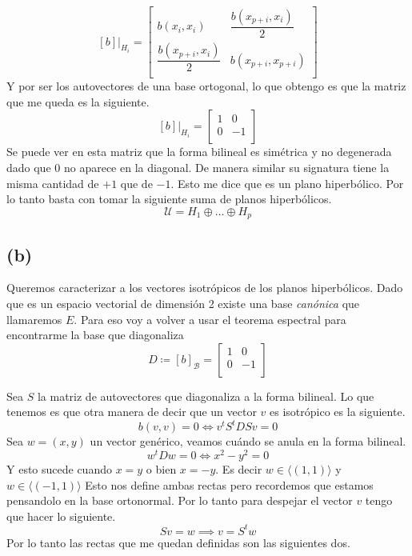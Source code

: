 \documentclass{article}
\begin{document}
 \begin{equation*}
 	\left. [b]\right| _ {H_i}	=
 	\begin{bmatrix}
 	b(x_{i}, x_{i}) & \dfrac{b(x_{p+i}, x_{i})}{2}  \\
 	\dfrac{b(x_{p+i}, x_{i})}{2} & b(x_{p+i}, x_{p+i}) \\
 	\end{bmatrix}
\end{equation*} 
  Y por ser los autovectores de una base ortogonal, lo que obtengo es que la matriz que me queda es la siguiente.
  \begin{equation*}
  \left. [b]\right| _ {H_i}	=
  \begin{bmatrix}
  1 & 0  \\
  0 & -1 \\
  \end{bmatrix}
  \end{equation*}
Se puede ver en esta matriz que la forma bilineal es simétrica y no degenerada dado que 0 no aparece en la diagonal. De manera similar su signatura tiene la misma cantidad de $+1$ que de $-1$. Esto me dice que es un plano hiperbólico. Por lo tanto basta con tomar la siguiente suma de planos hiperbólicos.
\begin{equation*}
 \mathcal{U} = H_1 \oplus \dots \oplus H_{p} 
\end{equation*} 


\subsection*{(b)}

Queremos caracterizar a los vectores isotrópicos de los planos hiperbólicos. Dado que es un espacio vectorial de dimensión 2 existe una base \textit{canónica} que llamaremos $E$.
Para eso voy a volver a usar el teorema espectral para encontrarme la base que diagonaliza
 \begin{equation*}
D \coloneqq [b]_\mathcal{B}	=
\begin{bmatrix}
1 & 0  \\
0 & -1 \\
\end{bmatrix}
\end{equation*} 

Sea $S$ la matriz de autovectores que diagonaliza a la forma bilineal. Lo que tenemos es que otra manera de decir que un vector $v$ es isotrópico es la siguiente.
\[ b(v,v) = 0 \iff v^{t}S^{t}DSv=0 \]
Sea $w = (x, y)$ un vector genérico, veamos cuándo se anula en la forma bilineal. 
\[ w^{t}Dw = 0 \iff x^{2} - y^{2} = 0 \]
Y esto sucede cuando $x=y$ o bien $x=-y$. Es decir $w \in \langle (1,1) \rangle $ y $w \in \langle (-1,1) \rangle$ Esto nos define ambas rectas pero recordemos que estamos pensandolo en la base ortonormal. Por lo tanto para despejar el vector $v$ tengo que hacer lo siguiente.
\[ Sv = w \implies v= S^{t}w\]
Por lo tanto las rectas que me quedan definidas son las siguientes dos.
\end{document}
